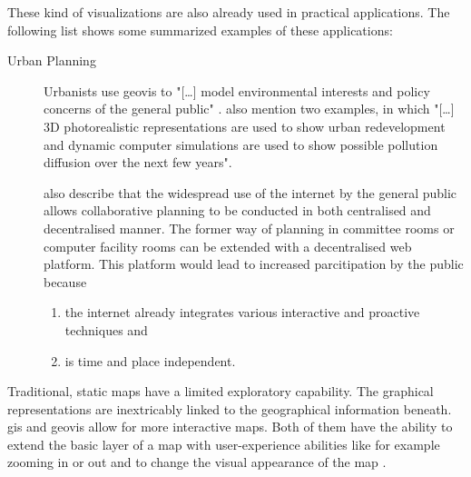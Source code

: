 These kind of visualizations are also already used in practical applications. The following list shows some summarized examples of these applications:
\begin{description}

\item[Urban Planning] \newline
Urbanists use \ac{geovis} to "[\ldots] model environmental interests and policy concerns of the general public" . \citeauthor{Jiang2003} also mention two examples, in which "[\ldots] 3D photorealistic representations are used to show urban redevelopment and dynamic computer simulations are used to show possible pollution diffusion over the next few years".

\citeauthor{Jiang2003} also describe that the widespread use of the internet by the general public allows collaborative planning to be conducted in both centralised and decentralised manner. The former way of planning in committee rooms or computer facility rooms can be extended with a decentralised web platform. This platform would lead to increased parcitipation by the public because
\begin{enumerate}
\item the internet already integrates various interactive and proactive techniques and
\item is time and place independent.
\end{enumerate}


\end{description}


Traditional, static maps have a limited exploratory capability. The graphical representations are inextricably linked to the geographical information beneath. \ac{gis} and \ac{geovis} allow for more interactive maps. Both of them have the ability to extend the basic layer of a map with user-experience abilities like for example zooming in or out and to change the visual appearance of the map .